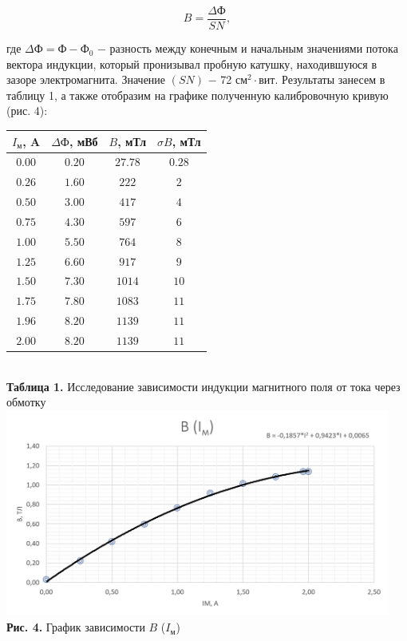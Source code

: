 \documentclass[a4paper,12pt]{article} %
\begin{document}
$$
B = \frac{\Delta \text{Ф}}{SN},
$$

\hfill \break где $\Delta \text{Ф} = \text{Ф} - \text{Ф}_{0}$ $-$ разность между конечным и начальным значениями потока вектора индукции, который пронизывал пробную катушку, находившуюся в зазоре электромагнита. Значение $(SN)$ $-$ 72 $\text{см}^2 \cdot \text{вит}$. Результаты занесем в таблицу 1, а также отобразим на графике полученную калибровочную кривую (рис. 4):

\begin{center}
\begin{tabular}{|c|c|c|c|}\hline
$I_\text{м}$, A&$\Delta \text{Ф}$, мВб&$B$, мТл&$\sigma B$, мТл\\\hline
$0.00$&$0.20$&$27.78$&$0.28$\\\hline
$0.26$&$1.60$&$222$&$2$\\\hline
$0.50$&$3.00$&$417$&$4$\\\hline
$0.75$&$4.30$&$597$&$6$\\\hline
$1.00$&$5.50$&$764$&$8$\\\hline
$1.25$&$6.60$&$917$&$9$\\\hline
$1.50$&$7.30$&$1014$&$10$\\\hline
$1.75$&$7.80$&$1083$&$11$\\\hline
$1.96$&$8.20$&$1139$&$11$\\\hline
$2.00$&$8.20$&$1139$&$11$\\\hline
\end{tabular}\\
\hfill \break \textbf {Таблица 1.} Исследование зависимости индукции магнитного поля от тока через обмотку\\
\includegraphics[width=0.95\textwidth]{3.3.4_4.png}\\
\textbf{Рис. 4.} График зависимости $B$ ($I_\text{м}$)~\\
\end{center}
\end{document}
